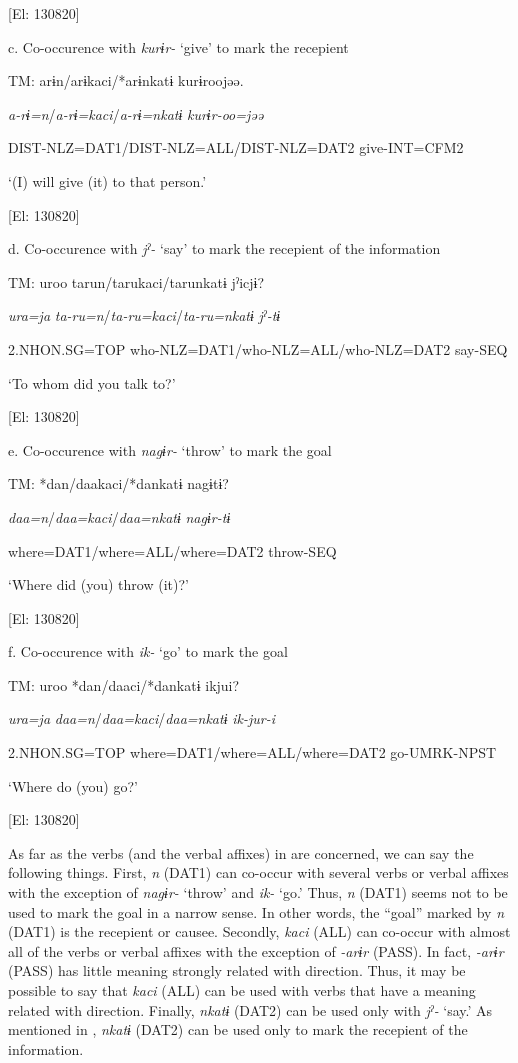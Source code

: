     [El: 130820]

  c. Co-occurence with \textit{kurɨr-} ‘give’ to mark the recepient

  TM:  arɨn/arɨkaci/*arɨnkatɨ  kurɨroojəə.

    \textit{a-rɨ=n}/\textit{a-rɨ=kaci}/\textit{a-rɨ=nkatɨ}  \textit{kurɨr-oo=jəə}

    DIST-NLZ=DAT1/DIST-NLZ=ALL/DIST-NLZ=DAT2  give-INT=CFM2

    ‘(I) will give (it) to that person.’

    [El: 130820]

  d. Co-occurence with \textit{jˀ-} ‘say’ to mark the recepient of the information

  TM:  uroo  tarun/tarukaci/tarunkatɨ  jˀicjɨ?

    \textit{ura=ja}  \textit{ta-ru=n}/\textit{ta-ru=kaci}/\textit{ta-ru=nkatɨ}  \textit{jˀ-tɨ}

    2.NHON.SG=TOP  who-NLZ=DAT1/who-NLZ=ALL/who-NLZ=DAT2  say-SEQ

    ‘To whom did you talk to?’

    [El: 130820]

  e. Co-occurence with \textit{nagɨr-} ‘throw’ to mark the goal

  TM:  *dan/daakaci/*dankatɨ  nagɨtɨ?

    \textit{daa=n}/\textit{daa=kaci}/\textit{daa=nkatɨ}  \textit{nagɨr-tɨ}

     where=DAT1/where=ALL/where=DAT2  throw-SEQ

     ‘Where did (you) throw (it)?’

    [El: 130820]

  f. Co-occurence with \textit{ik-} ‘go’ to mark the goal

  TM:  uroo  *dan/daaci/*dankatɨ  ikjui?

    \textit{ura=ja}  \textit{daa=n}/\textit{daa=kaci}/\textit{daa=nkatɨ}  \textit{ik-jur-i}

    2.NHON.SG=TOP  where=DAT1/where=ALL/where=DAT2  go-UMRK-NPST

     ‘Where do (you) go?’

    [El: 130820]

As far as the verbs (and the verbal affixes) in  are concerned, we can say the following things. First, \textit{n} (DAT1) can co-occur with several verbs or verbal affixes with the exception of \textit{nagɨr-} ‘throw’ and \textit{ik-} ‘go.’ Thus, \textit{n} (DAT1) seems not to be used to mark the goal in a narrow sense. In other words, the “goal” marked by \textit{n} (DAT1) is the recepient or causee. Secondly, \textit{kaci} (ALL) can co-occur with almost all of the verbs or verbal affixes with the exception of \textit{{}-arɨr} (PASS). In fact, \textit{{}-arɨr} (PASS) has little meaning strongly related with direction. Thus, it may be possible to say that \textit{kaci} (ALL) can be used with verbs that have a meaning related with direction. Finally, \textit{nkatɨ} (DAT2) can be used only with \textit{jˀ-} ‘say.’ As mentioned in , \textit{nkatɨ} (DAT2) can be used only to mark the recepient of the information.

